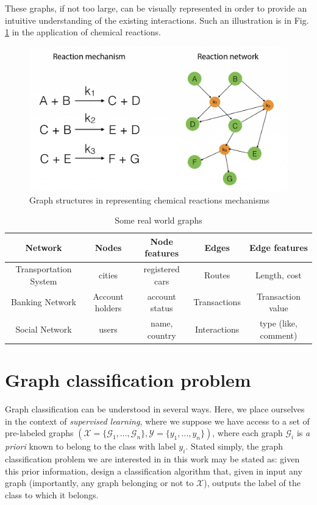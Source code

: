 These graphs, if not too large, can be visually represented in order to provide an intuitive understanding of the existing interactions. Such an illustration is in Fig. \ref{fig:Graph_Example} in the application of chemical reactions.



\begin{figure}[H]
\centering
\includegraphics[scale=0.2]{figs/Graph_example.png}
\caption[Graph example to represent Chemical Reactions]{Graph structures in representing chemical reactions mechanisms}
\label{fig:Graph_Example}
\end{figure}


\begin{table}
\small
\begin{center}
\begin{tabular}{|c|c|c|c|c|}
\hline
{Network}  &  {Nodes} & {Node features}  & {Edges}  & {Edge features}  \\
\hline
{Transportation System}  &  {cities} & {registered cars}  & {Routes}  & {Length, cost }  \\
\hline
{Banking Network}  &  {Account holders} & {account status}  & {Transactions}  & {Transaction value}  \\
\hline
{Social Network}  &  {users} & {name, country}  & {Interactions}  & {type (like, comment)}  \\
\hline
\end{tabular}
\end{center}
\caption{Some real world graphs}
\label{table:Graph_examples}
\end{table}

\section{Graph classification problem}
\label{sec:Graph_classification_problem}
Graph classification can be understood in several ways. Here, we place ourselves in the context of \emph{supervised learning}, where we suppose we have access to a set of pre-labeled graphs  $(\mathcal{X}=\{\mathcal{G}_1,\ldots,\mathcal{G}_n\}, \mathcal{Y}=\{y_1,\ldots,y_n\})$, where each graph $\mathcal{G}_i$ is \emph{a priori} known to belong to the class with label $y_i$. Stated simply, the graph classification problem we are interested in in this work may be stated as: given this prior information, design a classification algorithm that, given in input any graph (importantly, any graph belonging or not to $\mathcal{X}$), outputs the label of the class to which it belongs. 

